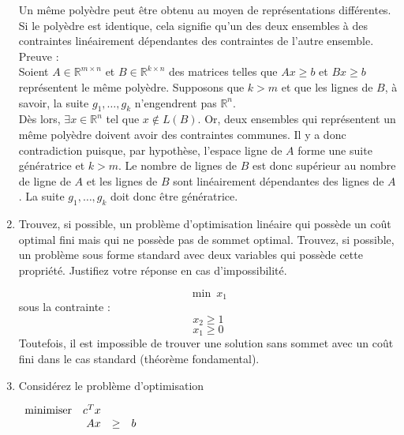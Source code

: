 \begin{enumerate}
    \begin{solution}
      Un même polyèdre peut être obtenu au moyen de représentations différentes. Si le polyèdre est identique, cela signifie qu'un des deux ensembles à des contraintes linéairement dépendantes des contraintes de l'autre ensemble. \\
      \newline
      Preuve : \\
      Soient $A \in \mathbb{R}^{m \times n} $ et $B \in \mathbb{R}^{k \times n} $ des matrices telles que $Ax \geq b$ et $Bx \geq b$ représentent le même polyèdre. Supposons que $ k > m$ et que les lignes de $B$, à savoir, la suite $g_{1}, \dots, g_{k}$ n'engendrent pas $\mathbb{R}^{n}$. \\
      Dès lors, $\exists x \in \mathbb{R}^{n}$ tel que $x \notin L(B)$. Or, deux ensembles qui représentent un même polyèdre doivent avoir des contraintes communes. Il y a donc contradiction puisque, par hypothèse, l'espace ligne de $A$ forme une suite génératrice et $ k > m$. Le nombre de lignes de $B$ est donc supérieur au nombre de ligne de $A$ et les lignes de $B$ sont linéairement dépendantes des lignes de $A$. La suite $g_{1}, \dots, g_{k}$ doit donc être génératrice. %
    \end{solution}

  \item Trouvez, si possible, un problème d'optimisation linéaire qui possède un coût optimal fini mais qui ne possède pas de sommet optimal.
    Trouvez, si possible, un problème  sous forme standard avec deux variables qui possède cette propriété.  Justifiez votre réponse en cas
    d'impossibilité.







    \begin{solution}
      $$\min ~x_{1}$$
      sous la contrainte : \\
      $$ x_{2} \geq 1 $$
      $$x_{1} \geq 0 $$
      Toutefois, il est impossible de trouver une solution sans sommet avec un coût fini dans le cas standard (théorème fondamental).
    \end{solution}

  \item     Considérez le problème d'optimisation

    $
    \begin{array}{lrcr}
      \mbox{minimiser} & c^T x \\
      & Ax & \geq & b
    \end{array}
    $


\end{enumerate}
